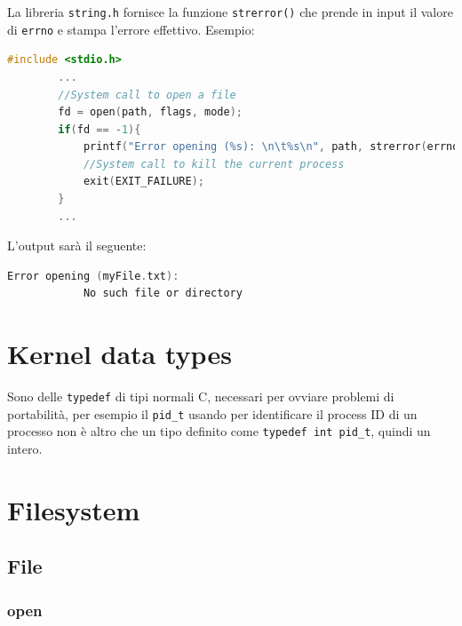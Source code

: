 \documentclass[a4paper, 12pt]{book}
\begin{document}
    La libreria \verb|string.h| fornisce la funzione 
    \verb|strerror()| che prende in input il valore di 
    \verb|errno| e stampa l'errore effettivo. Esempio:
    \begin{lstlisting}[language=C]
        #include <stdio.h>
        ... 
        //System call to open a file
        fd = open(path, flags, mode);
        if(fd == -1){
            printf("Error opening (%s): \n\t%s\n", path, strerror(errno));
            //System call to kill the current process
            exit(EXIT_FAILURE);
        }
        ...
    \end{lstlisting}
    L'output sarà il seguente:
    \begin{lstlisting}[language=C]
        Error opening (myFile.txt):
            No such file or directory        
    \end{lstlisting}

    \chapter{Kernel data types}

    Sono delle \verb|typedef| di tipi normali C, necessari
    per ovviare problemi di portabilità, per esempio 
    il \verb|pid_t| usando per identificare il process ID
    di un processo non è altro che un tipo definito come 
    \verb|typedef int pid_t|, quindi un intero.
    
    \chapter{Filesystem}

    \section{File}

    \subsection{open}
\end{document}
